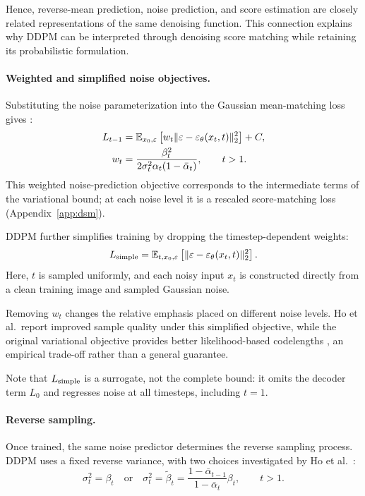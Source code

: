Hence, reverse-mean prediction, noise prediction, and
score estimation are closely related representations
of the same denoising function. This connection explains
why DDPM can be interpreted through denoising score
matching while retaining its probabilistic formulation.

\paragraph{Weighted and simplified noise objectives.}
Substituting the noise parameterization into the
Gaussian mean-matching loss gives
\cite[Eq.~12]{ho2020ddpm}:
\begin{align}
L_{t-1}
&=\mathbb{E}_{x_0,\varepsilon}\left[
w_t\|\varepsilon-\varepsilon_\theta(x_t,t)\|_2^2
\right]+C,
\label{eq:weightedloss}\\
w_t
&=\frac{\beta_t^2}
{2\sigma_t^2\alpha_t(1-\bar{\alpha}_t)},
\qquad t>1.
\label{eq:noiseweight}
\end{align}
This weighted noise-prediction objective corresponds
to the intermediate terms of the variational bound; at each noise level
it is a rescaled score-matching loss (Appendix~\ref{app:dsm}).

DDPM further simplifies training by dropping the
timestep-dependent weights:
\begin{equation}
L_{\rm simple}
=\mathbb{E}_{t,x_0,\varepsilon}
\left[
\|\varepsilon-\varepsilon_\theta(x_t,t)\|_2^2
\right].
\label{eq:loss}
\end{equation}
Here, $t$ is sampled uniformly, and each noisy input
$x_t$ is constructed directly from a clean training
image and sampled Gaussian noise.

Removing $w_t$ changes the relative emphasis placed
on different noise levels. Ho et al.\ report improved
sample quality under this simplified objective, while
the original variational objective provides better
likelihood-based codelengths
\cite[Secs.~3.4, 4.1--4.2]{ho2020ddpm}, an empirical
trade-off rather than a general guarantee.

Note that $L_{\rm simple}$ is a surrogate, not the
complete bound: it omits the decoder term $L_0$ and
regresses noise at all timesteps, including $t=1$.

\paragraph{Reverse sampling.}
Once trained, the same noise predictor determines the
reverse sampling process. DDPM uses a fixed reverse
variance, with two choices investigated by Ho et al.\
\cite[Sec.~3.2]{ho2020ddpm}:
\begin{equation}
\sigma_t^2=\beta_t
\quad\text{or}\quad
\sigma_t^2=\tilde{\beta}_t
=\frac{1-\bar{\alpha}_{t-1}}
{1-\bar{\alpha}_t}\beta_t,
\qquad t>1.
\label{eq:ddpmvariance}
\end{equation}

